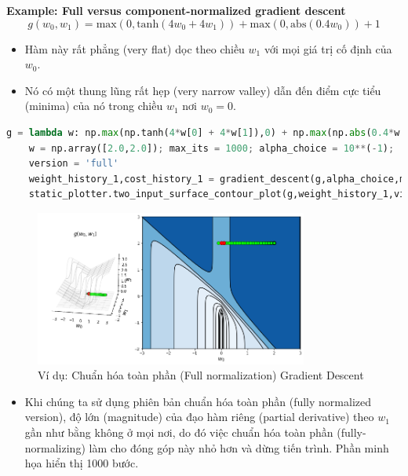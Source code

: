 \documentclass{book}
\begin{document}
\textbf{Example: Full versus component-normalized gradient descent}
\begin{equation*}
g(w_0,w_1) = \text{max}\left(0,\text{tanh}(4w_0 + 4w_1)\right) + \text{max}(0,\text{abs}\left(0.4w_0\right)) + 1
\end{equation*}
\begin{itemize}
    \item Hàm này rất phẳng (very flat) dọc theo chiều $w_1$ với mọi giá trị cố định của $w_0$.
    \item Nó có một thung lũng rất hẹp (very narrow valley) dẫn đến điểm cực tiểu (minima) của nó trong chiều $w_1$ nơi $w_0=0$.
\end{itemize}
\begin{lstlisting}[language=Python, caption={Đoạn mã Python của Gradient Descent chuẩn hóa toàn phần}, label={code:fully_normalized_gd}]
    g = lambda w: np.max(np.tanh(4*w[0] + 4*w[1]),0) + np.max(np.abs(0.4*w[0]),0) + 1
    w = np.array([2.0,2.0]); max_its = 1000; alpha_choice = 10**(-1);
    version = 'full'
    weight_history_1,cost_history_1 = gradient_descent(g,alpha_choice,max_its,w,version)
    static_plotter.two_input_surface_contour_plot(g,weight_history_1,view = [20,280],num_contours = 24,xmin = -3,xmax = 3,ymin = -2,ymax = 3)
\end{lstlisting}
\begin{figure}[H]
    \centering
    \includegraphics[width=0.8\textwidth]{images/fully_normalized_gd.png}
    \caption{Ví dụ: Chuẩn hóa toàn phần (Full normalization) Gradient Descent}
\end{figure}
\begin{itemize}
    \item Khi chúng ta sử dụng phiên bản chuẩn hóa toàn phần (fully normalized version), độ lớn (magnitude) của đạo hàm riêng (partial derivative) theo $w_1$ gần như bằng không ở mọi nơi, do đó việc chuẩn hóa toàn phần (fully-normalizing) làm cho đóng góp này nhỏ hơn và dừng tiến trình. Phần minh họa hiển thị 1000 bước.
\end{itemize}
\end{document}
